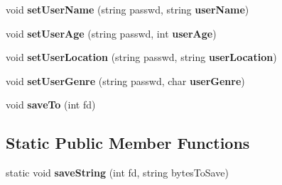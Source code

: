 \begin{CompactItemize}
\item 
void \textbf{setUserName} (string passwd, string {\bf userName})\label{classbr_1_1pucrio_1_1telemidia_1_1ginga_1_1core_1_1contextmanager_1_1GingaUser_7cc2a34ec715e3c0787fe26d955c4f79}

\item 
void \textbf{setUserAge} (string passwd, int {\bf userAge})\label{classbr_1_1pucrio_1_1telemidia_1_1ginga_1_1core_1_1contextmanager_1_1GingaUser_e4d3d850177bab7f1fc8310f2bedd249}

\item 
void \textbf{setUserLocation} (string passwd, string {\bf userLocation})\label{classbr_1_1pucrio_1_1telemidia_1_1ginga_1_1core_1_1contextmanager_1_1GingaUser_2f80337c92a04c2ec673fd730e9607c2}

\item 
void \textbf{setUserGenre} (string passwd, char {\bf userGenre})\label{classbr_1_1pucrio_1_1telemidia_1_1ginga_1_1core_1_1contextmanager_1_1GingaUser_c920bcccf6fa2630acdae3bec59e8ee1}

\item 
void \textbf{saveTo} (int fd)\label{classbr_1_1pucrio_1_1telemidia_1_1ginga_1_1core_1_1contextmanager_1_1GingaUser_aa67e05f4d36920c65c5db8a08d77eac}

\end{CompactItemize}
\subsection*{Static Public Member Functions}
\begin{CompactItemize}
\item 
static void \textbf{saveString} (int fd, string bytesToSave)\label{classbr_1_1pucrio_1_1telemidia_1_1ginga_1_1core_1_1contextmanager_1_1GingaUser_b64238854eac331b6236cbab2d7034a1}

\end{CompactItemize}
